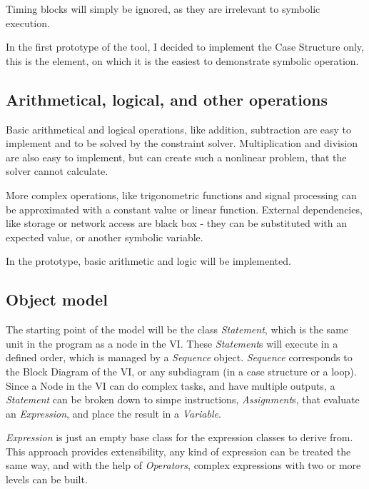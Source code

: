 Timing blocks will simply be ignored, as they are irrelevant to symbolic execution. 

In the first prototype of the tool, I decided to implement the Case Structure only, this is the element, on which it is the easiest to demonstrate symbolic operation. 
\subsection{Arithmetical, logical, and other operations}
Basic arithmetical and logical operations, like addition, subtraction are easy to implement and to be solved by the constraint solver. Multiplication and division are also easy to implement, but can create such a nonlinear problem, that the solver cannot calculate. 

More complex operations, like trigonometric functions and signal processing can be approximated with a constant value or linear function. External dependencies, like storage or network access are black box - they can be substituted with an expected value, or another symbolic variable.

In the prototype, basic arithmetic and logic will be implemented.

\subsection{Object model}

The starting point of the model will be the class \textit{Statement}, which is the same unit in the program as a node in the VI. These \textit{Statement}s will execute in a defined order, which is managed by a \textit{Sequence} object. \textit{Sequence} corresponds to the Block Diagram of the VI, or any subdiagram (in a case structure or a loop). Since a Node in the VI can do complex tasks, and have multiple outputs, a \textit{Statement} can be broken down to simpe instructions, \textit{Assignment}s, that evaluate an \textit{Expression}, and place the result in a \textit{Variable}.

\textit{Expression} is just an empty base class for the expression classes to derive from. This approach provides extensibility, any kind of expression can be treated the same way, and with the help of \textit{Operators}, complex expressions with two or more levels can be built.

